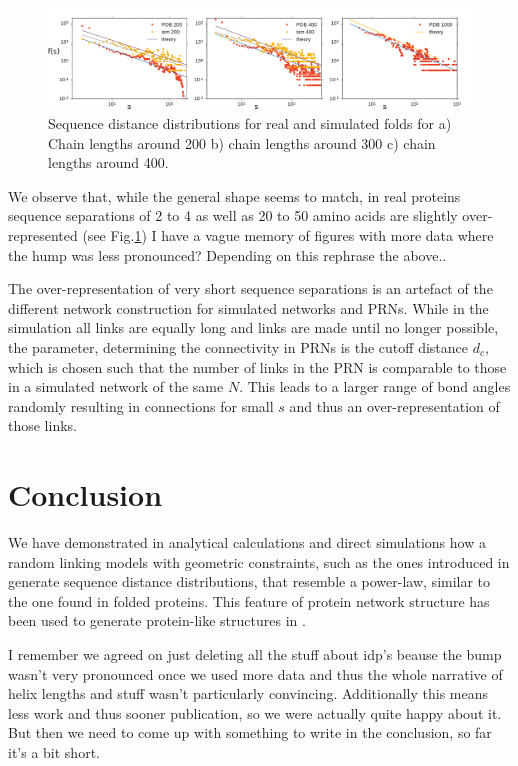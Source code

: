 \documentclass[
reprint,
twocolumn,
amsmath,amssymb,superscriptaddress,aps,
pre]{revtex4-1}
\newcommand{\red}[1]{\textcolor{red!80!black}{#1}}
\begin{document}
\begin{figure}[t]
        \centering
	\includegraphics[width=\textwidth]{paper/figures/resultsfig_old.pdf}
        \caption{Sequence distance distributions for real and simulated folds for a) Chain lengths around 200 b) chain lengths around 300 c) chain lengths around 400.
        }
        \label{fig:sdd}
\end{figure}
We observe that, while the general shape seems to match, in real proteins sequence separations of 2 to 4 as well as 20 to 50 amino acids are slightly over-represented (see Fig.\ref{fig:sdd}) \red{I have a vague memory of figures with more data where the hump was less pronounced? Depending on this rephrase the above.}.

The over-representation of very short sequence separations is an artefact of the different network construction for simulated networks and PRNs. While in the simulation all links are equally long and links are made until no longer possible, the parameter, determining the connectivity in PRNs is the cutoff distance $d_c$, which is chosen such that the number of links in the PRN is comparable to those in a simulated network of the same $N$. This leads to a larger range of bond angles randomly resulting in connections for small $s$ and thus an over-representation of those links.

\section*{Conclusion}
We have demonstrated in analytical calculations and direct simulations how a random linking models with geometric constraints, such as the ones introduced in \cite{molkenthin2016scaling, molkenthin2020self} generate sequence distance distributions, that resemble a power-law, similar to the one found in folded proteins. This feature of protein network structure has been used to generate protein-like structures in \cite{bartoli2008effect}.

\red{I remember we agreed on just deleting all the stuff about idp's beause the bump wasn't very pronounced once we used more data and thus the whole narrative of helix lengths and stuff wasn't particularly convincing. Additionally this means less work and thus sooner publication, so we were actually quite happy about it. But then we need to come up with something to write in the conclusion, so far it's a bit short.}
\end{document}
